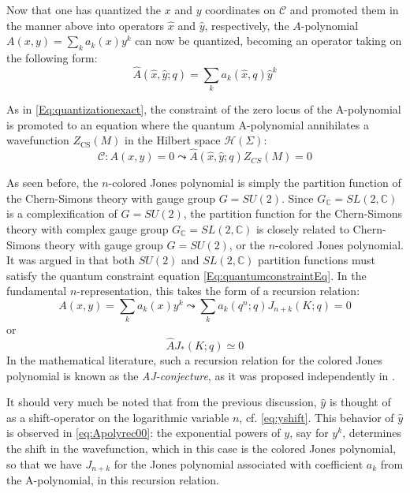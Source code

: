 \documentclass[a4paper,titlepage,twoside]{book}
\begin{document}
Now that one has quantized the $x$ and $y$ coordinates on $\mathcal{C}$ and promoted them in the manner above into operators $\widehat{x}$ and $\widehat{y}$, respectively, the $A$-polynomial $A(x,y) = \sum_k a_k(x) y^k$ can now be quantized, becoming an operator taking on the following form:
\begin{equation}
  \widehat{A}{ (\widehat{x}, \widehat{y}; q) } = \sum_k a_k{ (\widehat{x},q)} \widehat{y}^k
\end{equation}

As in \eqref{Eq:quantizationexact}, the constraint of the zero locus of the A-polynomial is promoted to an equation where the quantum A-polynomial annihilates a wavefunction $Z_{\text{CS}}{(M)}$ in the Hilbert space $\mathcal{H}{(\Sigma)}$:  
\begin{equation}
  \mathcal{C} : A(x,y) = 0 \leadsto \widehat{A}{ (\widehat{x}, \widehat{y}; q) } Z_{CS}{ (M) } = 0  \label{Eq:quantumconstraintEq}
\end{equation} 

As seen before, the $n$-colored Jones polynomial is simply the partition function of the Chern-Simons theory with gauge group $G = SU(2)$.  Since $G_{\mathbb{C}} = SL{ (2,\mathbb{C})}$ is a complexification of $G=SU(2)$, the partition function for the Chern-Simons theory with complex gauge group $G_{\mathbb{C}}= SL{ (2,\mathbb{C})}$ is closely related to Chern-Simons theory with gauge group $G=SU(2)$, or the $n$-colored Jones polynomial.  It was argued in \cite{Gukov2005} that both $SU(2)$ and $SL{(2, \mathbb{C})}$ partition functions must satisfy the quantum constraint equation \eqref{Eq:quantumconstraintEq}.  In the fundamental $n$-representation, this takes the form of a recursion relation:
\begin{equation}
  A(x,y) = \sum_k a_k(x) y^k \leadsto \sum_k a_k(q^n;q) J_{n+k}{ (K;q) } = 0 \label{eq:Apolyrec00}
\end{equation}
or 
\begin{equation}
\widehat{A} J_*{ (K;q) } \simeq 0
\end{equation}
In the mathematical literature, such a recursion relation for the colored Jones polynomial is known as the \emph{AJ-conjecture}, as it was proposed independently in \cite{Garoufalidis2004}.

It should very much be noted that from the previous discussion, $\widehat{y}$ is thought of as a shift-operator on the logarithmic variable $n$, cf. \eqref{eq:yshift}.  This behavior of $\widehat{y}$ is observed in \eqref{eq:Apolyrec00}: the exponential powers of $y$, say for $y^k$, determines the shift in the wavefunction, which in this case is the colored Jones polynomial, so that we have $J_{n+k}$ for the Jones polynomial associated with coefficient $a_k$ from the A-polynomial, in this recursion relation.  
\end{document}
